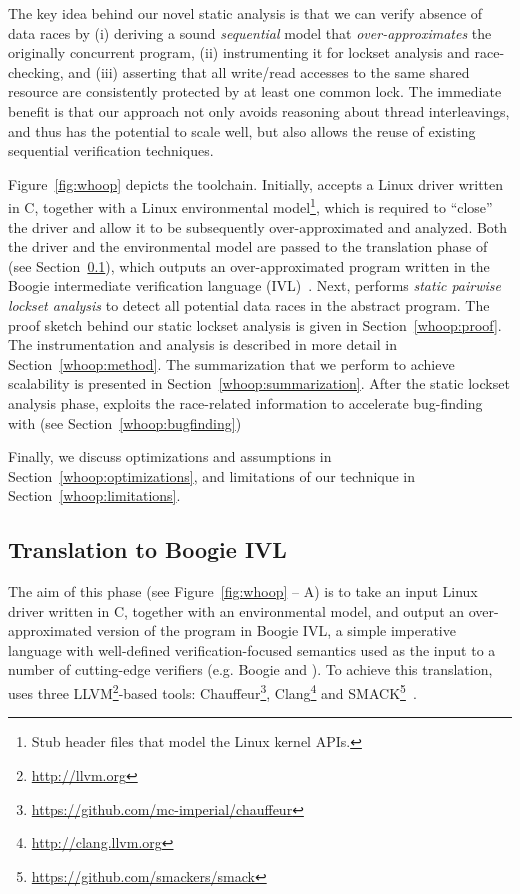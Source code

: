 The key idea behind our novel static analysis is that we can verify absence of data races by (i) deriving a sound \emph{sequential} model that \emph{over-approximates} the originally concurrent program, (ii) instrumenting it for lockset analysis and race-checking, and (iii) asserting that all write/read accesses to the same shared resource are consistently protected by at least one common lock. The immediate benefit is that our approach not only avoids reasoning about thread interleavings, and thus has the potential to scale well, but also allows the reuse of existing sequential verification techniques.

Figure~\ref{fig:whoop} depicts the \whoop toolchain. Initially, \whoop accepts a Linux driver written in C, together with a Linux environmental model\footnote{Stub header files that model the Linux kernel APIs.}, which is required to ``close'' the driver and allow it to be subsequently over-approximated and analyzed. Both the driver and the environmental model are passed to the translation phase of \whoop (see Section~\ref{whoop:translation}), which outputs an over-approximated program written in the Boogie intermediate verification language (IVL)~\cite{deline2005boogiepl}. Next, \whoop performs \emph{static pairwise lockset analysis} to detect all potential data races in the abstract program. The proof sketch behind our static lockset analysis is given in Section~\ref{whoop:proof}. The instrumentation and analysis is described in more detail in Section~\ref{whoop:method}. The summarization that we perform to achieve scalability is presented in Section~\ref{whoop:summarization}. After the static lockset analysis phase, \whoop exploits the race-related information to accelerate bug-finding with \corral (see Section~\ref{whoop:bugfinding})

Finally, we discuss optimizations and assumptions in Section~\ref{whoop:optimizations}, and limitations of our technique in Section~\ref{whoop:limitations}.

\subsection{Translation to Boogie IVL}
\label{whoop:translation}

The aim of this phase (see Figure~\ref{fig:whoop} -- A) is to take an input Linux driver written in C, together with an environmental model, and output an over-approximated version of the program in Boogie IVL, a simple imperative language with well-defined verification-focused semantics used as the input to a number of cutting-edge verifiers (e.g. Boogie and \corral). To achieve this translation, \whoop uses three LLVM\footnote{\url{http://llvm.org}}-based tools: Chauffeur\footnote{\url{https://github.com/mc-imperial/chauffeur}}, Clang\footnote{\url{http://clang.llvm.org}} and SMACK\footnote{\url{https://github.com/smackers/smack}}~\cite{rakamaric2014smack}.

